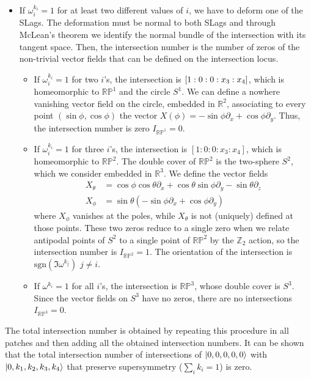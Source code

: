 \begin{itemize}
  \item If $\omega_i^{k_i}=1$ for at least two different values of $i$, we have to deform one of the SLags. 
    The deformation must be normal to both SLags and through McLean's theorem  we identify the normal bundle of the intersection
    with its tangent space.
    Then, the intersection number is the number of zeros of the non-trivial vector fields 
    that can be defined on the intersection locus.
    \begin{itemize}
  \item
    If $\omega_i^{k_i}= 1$ for two $i$'s, the intersection is $\qty[1:0:0:x_3:x_4]$, which is homeomorphic to $\mathbb{RP}^1$ and the circle $S^1$.
    We can define a nowhere vanishing vector field on the circle, embedded in $\mathbb R^2$, associating to 
    every point  $(\sin\phi,\cos\phi)$ the vector $X(\phi)=-\sin\phi\partial_x +\cos\phi\partial_y$.
    Thus, the intersection number is zero $I_{\mathbb{RP}^1}=0$.
  \item 
    If $\omega_i^{k_i}= 1$ for three $i$'s, the intersection is $[1:0:0:x_3:x_4]$, which is homeomorphic to $\mathbb{RP}^2$.
    The double cover of $\mathbb{RP}^2$ is the two-sphere $S^2$, which we consider embedded in $\mathbb R^3$.
    We define the vector fields
    \begin{align}
      X_\theta& =\cos\phi\cos\theta \partial_x+\cos\theta\sin\phi\partial_y-\sin\theta\partial_z\\
      X_\phi&=\sin\theta(-\sin\phi\partial_x+\cos\phi\partial_y)
    \end{align}
    where $X_\phi$ vanishes at the poles, while $X_\theta$ is not (uniquely) defined at those points.
    These two zeros reduce to a single zero when we relate antipodal points of $S^2$ to a single point
    of $\mathbb{RP}^2$ by the $\mathbb Z_2$ action, so the intersection number is $I_{\mathbb{RP}^2}=1$.
    The orientation of the intersection is $\mathrm{sgn}(\Im \omega^{k_j})$ $j\neq i$.
  \item 
    If $\omega^{k_i}=1$ for all $i$'s, the intersection is $\mathbb{RP}^3$, whose double cover is $S^3$.
    Since the vector fields on $S^3$ have no zeros, there are no intersections $I_{\mathbb{RP}^3}=0$.
    \end{itemize}
\end{itemize}

The total intersection number is obtained by repeating this procedure in all patches
and then adding all the obtained intersection numbers.
It can be shown that the total intersection number of intersections of
$\ket{0,0,0,0,0}$ with $\ket{0,k_1,k_2,k_3,k_4}$ that preserve supersymmetry ($\sum_i k_i=1$) is zero. 

